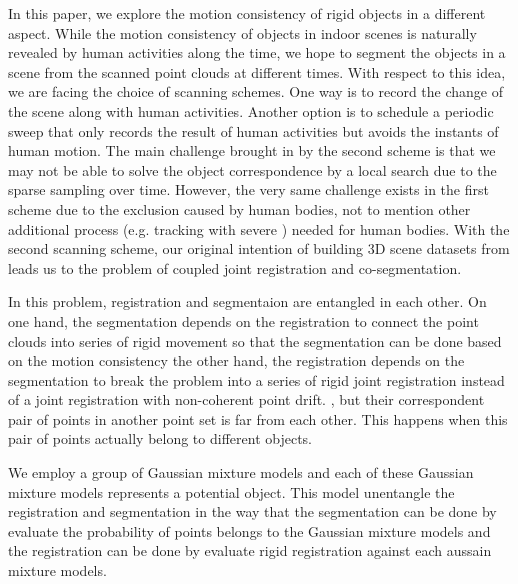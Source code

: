 In this paper, we explore the motion consistency of rigid objects in a different aspect.
%
While the motion consistency of objects in indoor scenes is naturally revealed by human activities along the time, we hope to segment the objects in a scene from the scanned point clouds at different times. 
%
With respect to this idea, we are facing the choice of scanning schemes. 
%
One way is to record the change of the scene along with human activities.
Another option is to schedule a periodic sweep that only records the result of human activities but avoids the instants of human motion. 
%
The main challenge brought in by the second scheme is that we may not be able to solve the object correspondence by a local search due to the sparse sampling over time.
However, the very same challenge exists in the first scheme due to the exclusion caused by human bodies, not to mention other additional process (e.g. tracking with severe ) needed for human bodies. 
%
%
With the second scanning scheme, our original intention of building 3D scene datasets from   leads us to the problem of coupled joint registration and co-segmentation.


In this problem, registration and segmentaion  are entangled in each other. 
%
On one hand, the segmentation depends on the registration to connect the point clouds into series of rigid movement so that the  segmentation can be done based on the motion consistency  the other hand, the registration depends on the segmentation to break the problem into a series of rigid joint registration instead of a joint registration with non-coherent point drift.
, but their correspondent  pair of points in another point set is far from each other. 
%
This happens when this pair of points actually belong to different objects.



We employ a group of Gaussian mixture models and each of these Gaussian mixture models represents a potential object. 
This model unentangle  the registration and segmentation in the way that the segmentation can be done by evaluate the probability of points belongs to the Gaussian mixture models and the registration can be done by evaluate rigid registration against each aussain mixture models.


